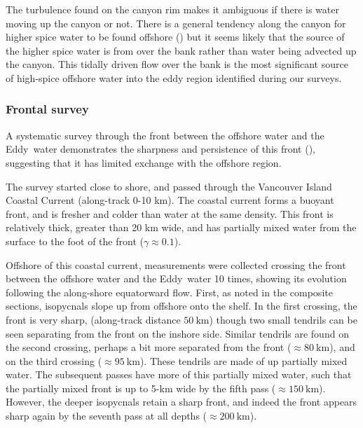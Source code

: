 \documentclass[draft]{agujournal2019}
\newcommand*{\Eddy}{{\sc Eddy}}
\begin{document}
The turbulence found on the canyon rim makes it ambiguous if there is water moving up the canyon or not.  There is a general tendency along the canyon for higher spice water to be found offshore () but it seems likely that the source of the higher spice water is from over the bank rather than water being advected up the canyon.  This tidally driven flow over the bank is the most significant source of high-spice offshore water into the eddy region identified during our surveys.

\subsubsection{Frontal survey}
\label{sec:frontsurvey}

A systematic survey through the front between the offshore water and the \Eddy\ water demonstrates the sharpness and persistence of this front (), suggesting that it has limited exchange with the offshore region.

The survey started close to shore, and passed through the Vancouver Island Coastal Current (along-track 0-10 km).  The coastal current forms a buoyant front, and is fresher and colder than water at the same density.  This front is relatively thick, greater than 20 km wide, and has partially mixed water from the surface to the foot of the front ($\gamma\approx0.1$).

Offshore of this coastal current, measurements were collected crossing the front between the offshore water and the \Eddy\ water 10 times, showing its evolution following the along-shore equatorward flow.  First, as noted in the composite sections, isopycnals slope up from offshore onto the shelf.  In the first crossing, the front is very sharp, (along-track distance $50\ \mathrm{km}$) though two small tendrils can be seen separating from the front on the inshore side.  Similar tendrils are found on the second crossing, perhaps a bit more separated from the front ($\approx 80\ \mathrm{km}$), and on the third crossing ($\approx 95\ \mathrm{km}$).  These tendrils are made of up partially mixed water.  The subsequent passes have more of this partially mixed water, such that the partially mixed front is up to 5-km wide by the fifth pass ($\approx 150\ \mathrm{km}$).  However, the deeper isopycnals retain a sharp front, and indeed the front appears sharp again by the seventh pass at all depths ($\approx 200\ \mathrm{km}$).
\end{document}
